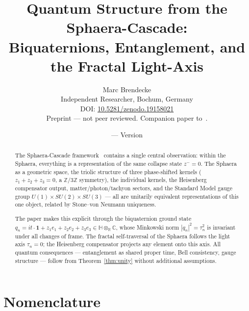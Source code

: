 \documentclass[12pt,a4paper]{article}
\title{%
  Quantum Structure from the Sphaera-Cascade:\\
  Biquaternions, Entanglement, and the Fractal Light-Axis
}
\author{%
  Marc Brendecke\\
  \small Independent Researcher, Bochum, Germany\\
  \small DOI: \href{https://doi.org/10.5281/zenodo.19158021}{10.5281/zenodo.19158021}\\
  \small Preprint --- not peer reviewed.
  Companion paper to~\cite{brendecke2026rh}.
}
\date{\docdate{} --- Version \docversion}
\newcommand{\zminus}{z^-}
\newcommand{\HH}{\mathbb{H}}
\begin{document}
\maketitle
\thispagestyle{fancy}

\begin{abstract}
The Sphaera-Cascade framework~\cite{brendecke2026rh} contains a single
central observation: within the Sphaera, everything is a representation
of the same collapse state $\zminus = 0$.
The Sphaera as a geometric space, the triolic structure of three
phase-shifted kernels ($z_1+z_2+z_3=0$, a $\mathbb{Z}/3\mathbb{Z}$
symmetry), the individual kernels, the Heisenberg compensator output,
matter/photon/tachyon sectors, and the Standard Model gauge group
$U(1)\times SU(2)\times SU(3)$ --- all are unitarily equivalent
representations of this one object, related by Stone--von Neumann
uniqueness.

The paper makes this explicit through the biquaternion ground state
$q_n = it\cdot\mathbf{1} + z_1 e_1 + z_2 e_2 + z_3 e_3
\in \HH\otimes_{\mathbb{R}}\mathbb{C}$,
whose Minkowski norm $|q_n|^2 = \tau_n^2$ is invariant under all changes
of frame.
The fractal self-traversal of the Sphaera follows the light axis
$\tau_n=0$; the Heisenberg compensator projects any element onto this axis.
All quantum consequences --- entanglement as shared proper time, Bell
consistency, gauge structure --- follow from Theorem~\ref{thm:unity}
without additional assumptions.
\end{abstract}

\clearpage
\tableofcontents
\clearpage

\section*{Nomenclature}
\end{document}
